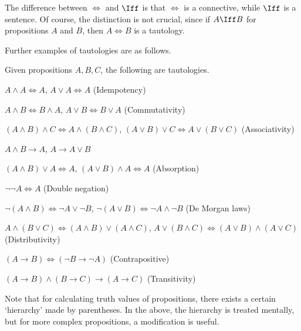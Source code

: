 The difference between \(\iff\) and \(\Iff\)
is that \(\iff\) is a connective,
while \(\Iff\) is a sentence.
Of course, the distinction is not crucial,
since if \(A\Iff B\) for propositions \(A\) and \(B\),
then \(A\iff B\) is a tautology.

Further examples of tautologies are as follows.

\begin{example}
    \label{exm:taut}
    Given propositions \(A,B,C\), the following are tautologies.
    \begin{nlist}
        \item \(A\wedge A\iff A\),
        \(A\vee A\iff A\)
        \hfill (Idempotency)

        \item \(A\wedge B\iff B\wedge A\),
        \(A\vee B\iff B\vee A\)
        \hfill (Commutativity)

        \item \((A\wedge B)\wedge C\iff A\wedge (B\wedge C)\),
        \((A\vee B)\vee C\iff A\vee(B\vee C)\)
        \hfill (Associativity)

        \item \(A\wedge B\to A\),
        \(A\to A\vee B\)

        \item \((A\wedge B)\vee A\iff A\),
        \((A\vee B)\wedge A\iff A\)
        \hfill (Absorption)

        \item \(\neg\neg A\iff A\)
        \hfill (Double negation)

        \item \(\neg(A\wedge B)\iff\neg A\vee\neg B\),
        \(\neg(A\vee B)\iff\neg A\wedge\neg B\)
        \hfill (De Morgan laws)

        \item \(A\wedge(B\vee C)\iff(A\wedge B)\vee(A\wedge C)\),
        \(A\vee(B\wedge C)\iff(A\vee B)\wedge(A\vee C)\)
        \hfill (Distributivity)
        
        \item \((A\to B)\iff(\neg B\to\neg A)\)
        \hfill (Contrapositive)

        \item \((A\to B)\wedge(B\to C)\to(A\to C)\)
        \hfill (Transitivity)
    \end{nlist}
\end{example}

Note that for calculating truth values of propositions,
there exists a certain `hierarchy' made by parentheses.
In the above, the hierarchy is treated mentally,
but for more complex propositions, a modification is useful.

